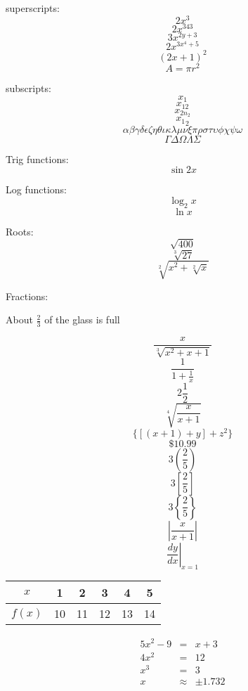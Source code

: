 \documentclass[11pt]{article}
\begin{document}
 superscripts: 
 $$2x^3$$
 $$2x^{343}$$
 $$3x^{2y+3}$$
 $$2x^{3x^4+5}$$
 $$(2x+1)^2$$
 $$A=\pi r^2$$
 
 subscripts:
 $$x_1$$
 $$x_{12}$$
 $$x_{2n_2}$$
 $${x_1}_2$$
 $$\alpha	 \beta \gamma \delta \epsilon \zeta \eta \theta \iota \kappa \lambda \mu \nu \xi \pi	 \rho \sigma \tau \upsilon \phi \chi \psi \omega$$
 $$\Gamma \Delta \Omega \Lambda \Sigma$$
 
 
 Trig functions:
 $$\sin{2x}$$
 
 Log functions:
 $$\log_2{x}$$
 $$\ln{x}$$
 
 Roots:
 $$\sqrt{400}$$
$$\sqrt[3]{27}$$
$$\sqrt[2]{x^2+\sqrt[2]{x}}$$

Fractions:

About $\displaystyle{\frac{2}{3}}$ of the glass is full

$$\frac{x}{\sqrt[3]{x^2+x+1}}$$
$$\frac{1}{1+\frac{1}{x}}$$
$$2\frac{1}{2}$$
$$\sqrt[4]{\frac{x}{x+1}}$$
$$\{[(x+1)+y]+z^2\}$$
$$\$10.99$$
$$3\left(\frac{2}{5}\right)$$ 
$$3\left[\frac{2}{5}\right]$$ 
$$3\left\{\frac{2}{5}\right\}$$
$$\left|\frac{x}{x+1}\right|$$
$$\left.\frac{dy}{dx}\right|_{x=1}$$

\begin{tabular}{|c|c|c|c|c|c|}
\hline
$x$ & 1 & 2 & 3 & 4 & 5 \\ \hline
$f(x)$ & 10 & 11 & 12 & 13 & 14 \\ \hline

\end{tabular}

\begin{eqnarray*}
5x^2-9&=&x+3\\
4x^2&=&12\\
x^3&=&3\\
x&\approx& \pm 1.732
\end{eqnarray*}
\end{document}
